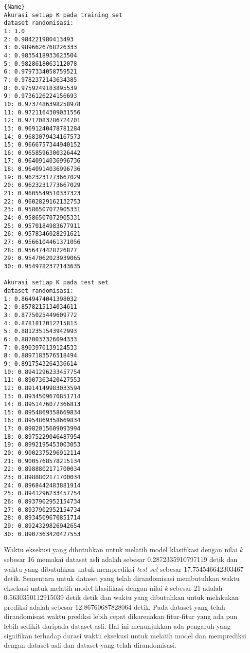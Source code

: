 \begin{minipage}{.48\textwidth}
\begin{lstlisting}[caption=Akurasi Dataset Randomisasi,frame=tlrb, label=mobile_sensor_akurasi_randomisasi]{Name}
Akurasi setiap K pada training set 
dataset randomisasi: 
1: 1.0
2: 0.984221980413493
3: 0.9896626768226333
4: 0.9835418933623504
5: 0.9828618063112078
6: 0.9797334058759521
7: 0.9782372143634385
8: 0.9759249183895539
9: 0.9736126224156693
10: 0.9737486398258978
11: 0.9721164309031556
12: 0.9717083786724701
13: 0.9691240478781284
14: 0.9683079434167573
15: 0.9666757344940152
16: 0.9658596300326442
17: 0.9640914036996736
18: 0.9640914036996736
19: 0.9623231773667029
20: 0.9623231773667029
21: 0.9605549510337323
22: 0.9602829162132753
23: 0.9586507072905331
24: 0.9586507072905331
25: 0.9570184983677911
26: 0.9578346028291621
27: 0.9566104461371056
28: 0.956474428726877
29: 0.9547062023939065
30: 0.9549782372143635

Akurasi setiap K pada test set 
dataset randomisasi: 
1: 0.8649474041398032
2: 0.8578215134034611
3: 0.8775025449609772
4: 0.8781812012215813
5: 0.8812351543942993
6: 0.8870037326094333
7: 0.8903970139124533
8: 0.8897183576518494
9: 0.8917543264336614
10: 0.8941296233457754
11: 0.8907363420427553
12: 0.8914149983033594
13: 0.8934509670851714
14: 0.8951476077366813
15: 0.8954869358669834
16: 0.8954869358669834
17: 0.8982015609093994
18: 0.8975229046487954
19: 0.8992195453003053
20: 0.9002375296912114
21: 0.9005768578215134
22: 0.8988802171700034
23: 0.8988802171700034
24: 0.8968442483881914
25: 0.8941296233457754
26: 0.8937902952154734
27: 0.8937902952154734
28: 0.8934509670851714
29: 0.8924329826942654
30: 0.8907363420427553
\end{lstlisting}
\end{minipage}

Waktu eksekusi yang dibutuhkan untuk melatih model klasifikasi dengan nilai \textit{k} sebesar 16 memakai dataset asli adalah sebesar 0.2872335910797119 detik dan waktu yang dibutuhkan untuk memprediksi \textit{test set} sebesar 17.754546642303467 detik. Sementara untuk dataset yang telah dirandomisasi membutuhkan waktu eksekusi untuk melatih model klasifikasi dengan nilai \textit{k} sebesar 21 adalah 0.5630350112915039 detik detik dan waktu yang dibutuhkan untuk melakukan prediksi adalah sebesar 12.86760687828064 detik. Pada dataset yang telah dirandomisasi waktu prediksi lebih cepat dikarenakan fitur-fitur yang ada pun lebih sedikit daripada dataset asli. Hal ini menunjukkan ada pengaruh yang signifikan terhadap durasi waktu eksekusi untuk melatih model dan memprediksi dengan dataset asli dan dataset yang telah dirandomisasi.

